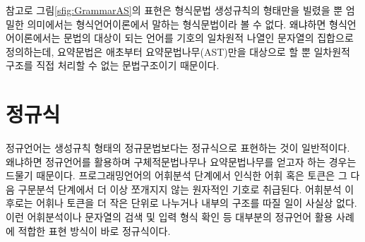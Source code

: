 참고로 그림\;\ref{sfig:GrammarAS}의 표현은 형식문법 생성규칙의
형태만을 빌렸을 뿐 엄밀한 의미에서는 형식언어이론에서 말하는
형식문법이라 볼 수 없다. 왜냐하면 형식언어이론에서는 문법의
대상이 되는 언어를 기호의 일차원적 나열인 문자열의 집합으로
정의하는데, 요약문법은 애초부터 요약문법나무(AST)만을 대상으로
할 뿐 일차원적 구조를 직접 처리할 수 없는 문법구조이기 때문이다.

\section{정규식}
\label{sec:regex}
정규언어는 생성규칙 형태의 정규문법보다는 정규식으로 표현하는 것이
일반적이다. 왜냐하면 정규언어를 활용하며 구체적문법나무나 요약문법나무를
얻고자 하는 경우는 드물기 때문이다. 프로그래밍언어의 어휘분석 단계에서
인식한 어휘 혹은 토큰은 그 다음 구문분석 단계에서 더 이상 쪼개지지 않는
원자적인 기호로 취급된다. 어휘분석 이후로는 어휘나 토큰을 더 작은 단위로
나누거나 내부의 구조를 따질 일이 사실상 없다. 이런 어휘분석이나 문자열의
검색 및 입력 형식 확인 등 대부분의 정규언어 활용 사례에 적합한 표현 방식이
바로 정규식이다.

